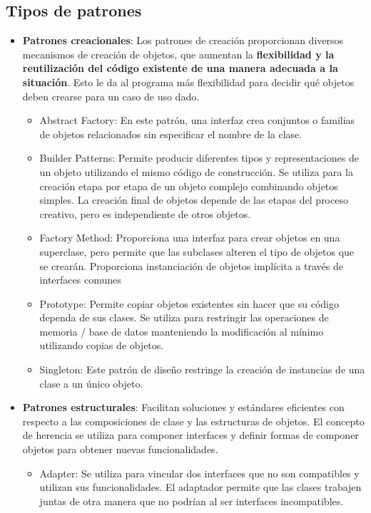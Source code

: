 \documentclass[
	12pt, %
	fleqn, %
	a4paper, %
	oneside, %
]{LegrandOrangeBook}
\begin{document}
\subsection{Tipos de patrones}
\begin{itemize}
\item \textbf{Patrones creacionales}: Los patrones de creación proporcionan diversos mecanismos de creación de objetos, que aumentan la \textbf{flexibilidad y la reutilización del código existente de una manera adecuada a la situación}. Esto le da al programa más flexibilidad para decidir qué objetos deben crearse para un caso de uso dado.
\begin{itemize}
\item Abstract Factory: En este patrón, una interfaz crea conjuntos o familias de objetos relacionados sin especificar el nombre de la clase.
\item Builder Patterns: Permite producir diferentes tipos y representaciones de un objeto utilizando el mismo código de construcción. Se utiliza para la creación etapa por etapa de un objeto complejo combinando objetos simples. La creación final de objetos depende de las etapas del proceso creativo, pero es independiente de otros objetos.
\item Factory Method: Proporciona una interfaz para crear objetos en una superclase, pero permite que las subclases alteren el tipo de objetos que se crearán. Proporciona instanciación de objetos implícita a través de interfaces comunes
\item Prototype: Permite copiar objetos existentes sin hacer que su código dependa de sus clases. Se utiliza para restringir las operaciones de memoria / base de datos manteniendo la modificación al mínimo utilizando copias de objetos.
\item Singleton: Este patrón de diseño restringe la creación de instancias de una clase a un único objeto. 
\end{itemize}
\item \textbf{Patrones estructurales}: Facilitan soluciones y estándares eficientes con respecto a las composiciones de clase y las estructuras de objetos. El concepto de herencia se utiliza para componer interfaces y definir formas de componer objetos para obtener nuevas funcionalidades.
\begin{itemize}
\item Adapter: Se utiliza para vincular dos interfaces que no son compatibles y utilizan sus funcionalidades. El adaptador permite que las clases trabajen juntas de otra manera que no podrían al ser interfaces incompatibles.

\end{itemize}
\end{itemize}
\end{document}
